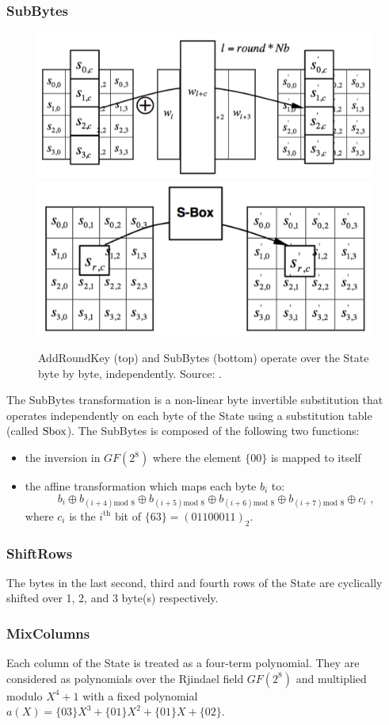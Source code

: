 \subsubsection*{SubBytes}
\begin{figure}
\centering
\includegraphics[width = .60\textwidth]{../Figures/FISP_AES/add_round_key.pdf} 
\includegraphics[width = .45\textwidth]{../Figures/FISP_AES/sbox.pdf} 
\caption[AddRoundKey and SubBytes.]{AddRoundKey (top) and SubBytes (bottom) operate over the State byte by byte, independently. Source: \cite{nist197}.}\label{fig:AES_sbox}
\end{figure}
The SubBytes transformation is a non-linear byte invertible substitution that operates independently on each byte of the State using a substitution table (called $\mathrm{Sbox}$). The SubBytes is composed of the following two functions:
\begin{itemize}
\item the inversion in $GF(2^8)$ where the element $\{00\}$ is mapped to itself
\item the affine transformation which maps each byte $b_i$ to:
\begin{equation}
b_i \oplus b_{(i+4)\mbox{mod }8} \oplus b_{(i+5)\mbox{mod }8} \oplus b_{(i+6)\mbox{mod }8} \oplus b_{(i+7)\mbox{mod }8} \oplus c_i \mbox{ ,}
\end{equation}
 where $c_i$ is the $i^\text{th}$ bit of $\{63\}  = (01100011)_2$.
\end{itemize}  
\subsubsection*{ShiftRows}
The bytes in the last second, third and fourth rows of the State are cyclically shifted over 1, 2, and 3 byte(s) respectively.
\subsubsection*{MixColumns}
Each column of the State is treated as a four-term polynomial. They are considered as polynomials over the Rjindael field $GF(2^8)$ and multiplied modulo $X^4 +1$ with a fixed polynomial $a(X) = \{03\}X^3 +\{01\}X^2 + \{01\}X + \{02\}$.

